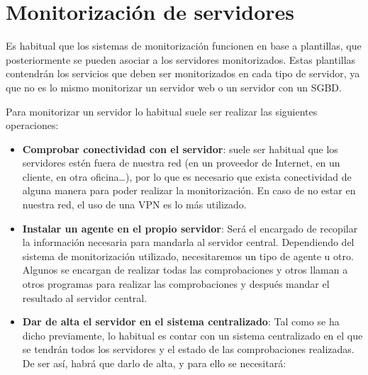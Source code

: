 \section{Monitorización de servidores}
Es habitual que los sistemas de monitorización funcionen en base a plantillas, que posteriormente se pueden asociar a los servidores monitorizados. Estas plantillas contendrán los servicios que deben ser monitorizados en cada tipo de servidor, ya que no es lo mismo monitorizar un servidor web o un servidor con un SGBD.

Para monitorizar un servidor lo habitual suele ser realizar las siguientes operaciones:

\begin{itemize}
    \item \textbf{Comprobar conectividad con el servidor}: suele ser habitual que los servidores estén fuera de nuestra red (en un proveedor de Internet, en un cliente, en otra oficina…), por lo que es necesario que exista conectividad de alguna manera para poder realizar la monitorización. En caso de no estar en nuestra red, el uso de una VPN es lo más utilizado.
    \item \textbf{Instalar un agente en el propio servidor}: Será el encargado de recopilar la información necesaria para mandarla al servidor central. Dependiendo del sistema de monitorización utilizado, necesitaremos un tipo de agente u otro. Algunos se encargan de realizar todas las comprobaciones y otros llaman a otros programas para realizar las comprobaciones y después mandar el resultado al servidor central.
    \item \textbf{Dar de alta el servidor en el sistema centralizado}: Tal como se ha dicho previamente, lo habitual es contar con un sistema centralizado en el que se tendrán todos los servidores y el estado de las comprobaciones realizadas. De ser así, habrá que darlo de alta, y para ello se necesitará:


\end{itemize}
